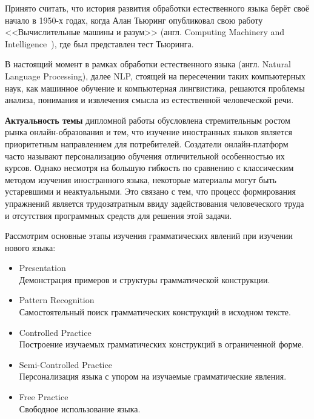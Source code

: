 





\Intro
Принято считать, что история развития обработки естественного языка берёт своё начало в 1950-х годах, когда Алан Тьюринг опубликовал свою работу <<Вычислительные машины и разум>> (англ. Computing Machinery and Intelligence~\cite{turing1950computing}), где был представлен тест Тьюринга.

В настоящий момент в рамках обработки естественного языка (англ. Natural Language Processing), далее NLP, стоящей на пересечении таких компьютерных наук, как машинное обучение и компьютерная лингвистика, решаются проблемы анализа, понимания и извлечения смысла из естественной человеческой речи.

\textbf{Актуальность темы} дипломной работы обусловлена стремительным ростом рынка онлайн-образования и тем, что изучение иностранных языков является приоритетным направлением для потребителей.
Создатели онлайн-платформ часто называют персонализацию обучения отличительной особенностью их курсов. Однако несмотря на большую гибкость по сравнению с классическим методом изучения иностранного языка, некоторые материалы могут быть устаревшими и неактуальными. Это связано с тем, что процесс формирования упражнений является трудозатратным ввиду задействования человеческого труда и отсутствия программных средств для решения этой задачи.

Рассмотрим основные этапы изучения грамматических явлений при изучении нового языка:

\begin{itemize}
  \item Presentation \\ Демонстрация примеров и структуры грамматической конструкции.
  \item Pattern Recognition\\Самостоятельный поиск грамматических конструкций в исходном тексте.
 \item Controlled Practice\\Построение изучаемых грамматических конструкций в ограниченной форме.
 \item Semi-Controlled Practice\\Персонализация языка с упором на изучаемые грамматические явления.
 \item Free Practice\\Свободное использование языка.
\end{itemize}

